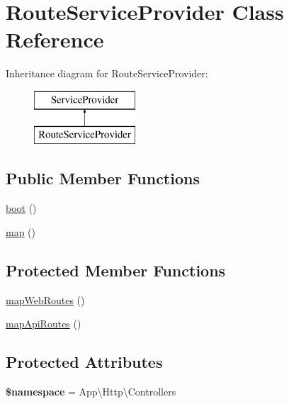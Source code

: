 \hypertarget{class_app_1_1_providers_1_1_route_service_provider}{}\section{Route\+Service\+Provider Class Reference}
\label{class_app_1_1_providers_1_1_route_service_provider}
Inheritance diagram for Route\+Service\+Provider\+:\begin{figure}[H]
\begin{center}
\leavevmode
\includegraphics[height=2.000000cm]{class_app_1_1_providers_1_1_route_service_provider}
\end{center}
\end{figure}
\subsection*{Public Member Functions}
\begin{DoxyCompactItemize}
\item 
\mbox{\hyperlink{class_app_1_1_providers_1_1_route_service_provider_a8814ea4b5beba763c570b4818980814e}{boot}} ()
\item 
\mbox{\hyperlink{class_app_1_1_providers_1_1_route_service_provider_a7f35c814c022f4191d359b5dc139d35b}{map}} ()
\end{DoxyCompactItemize}
\subsection*{Protected Member Functions}
\begin{DoxyCompactItemize}
\item 
\mbox{\hyperlink{class_app_1_1_providers_1_1_route_service_provider_ac887962db9a9a8f344572bd205a02165}{map\+Web\+Routes}} ()
\item 
\mbox{\hyperlink{class_app_1_1_providers_1_1_route_service_provider_ad400e7ca0cea76b9680eeb68b55ea0e0}{map\+Api\+Routes}} ()
\end{DoxyCompactItemize}
\subsection*{Protected Attributes}
\begin{DoxyCompactItemize}
\item 
\mbox{\label{class_app_1_1_providers_1_1_route_service_provider_a3825c9b9060c2d6ef594385997cd60aa}} 
{\bfseries \$namespace} = \textquotesingle{}App\textbackslash{}\+Http\textbackslash{}\+Controllers\textquotesingle{}
\end{DoxyCompactItemize}


